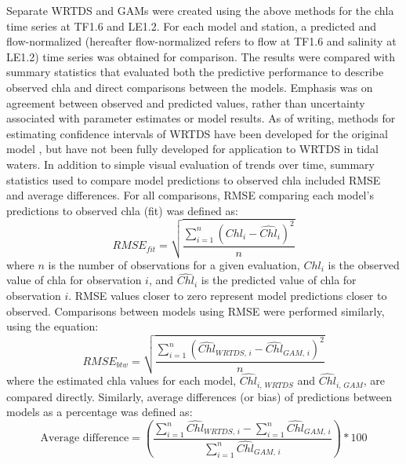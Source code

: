 \documentclass[letterpaper,12pt,oneside]{article}\usepackage[]{graphicx}\usepackage[]{color}
\begin{document}
Separate \ac{WRTDS} and \acp{GAM} were created using the above methods for the \ac{chla} time series at TF1.6 and LE1.2. For each model and station, a predicted and flow-normalized (hereafter flow-normalized refers to flow at TF1.6 and salinity at LE1.2) time series was obtained for comparison.  The results were compared with summary statistics that evaluated both the predictive performance to describe observed \ac{chla} and direct comparisons between the models.  Emphasis was on agreement between observed and predicted values, rather than uncertainty associated with parameter estimates or model results.  As of writing, methods for estimating confidence intervals of \ac{WRTDS} have been developed for the original model \citep{Hirsch15}, but have not been fully developed for application to \ac{WRTDS} in tidal waters.  In addition to simple visual evaluation of trends over time, summary statistics used to compare model predictions to observed \ac{chla} included \ac{RMSE} and average differences.  For all comparisons, \ac{RMSE} comparing each model's predictions to observed \ac{chla} (fit) was defined as:
\begin{equation}
RMSE_{fit} = \sqrt {\frac{{\sum\limits_{{i = 1}}^n {{{\left( {{Chl_i} - {\widehat{Chl}_i}} \right)}^2}} }}{n}}
\end{equation}
where $n$ is the number of observations for a given evaluation, $Chl_i$ is the observed value of \ac{chla} for observation $i$, and ${\widehat{Chl}}_i$ is the predicted value of \ac{chla} for observation $i$.  \ac{RMSE} values closer to zero represent model predictions closer to observed.  Comparisons between models using \ac{RMSE} were performed similarly, using the equation:
\begin{equation} \label{rmse_fun}
RMSE_{btw} = \sqrt {\frac{{\sum\limits_{{i = 1}}^n {{{\left( {{\widehat{Chl}_{WRTDS,\,i}} - {{\widehat{Chl}}_{GAM,\,i}}} \right)}^2}} }}{n}}
\end{equation}
where the estimated \ac{chla} values for each model, $\widehat{Chl}_{i,\,WRTDS}$ and $\widehat{Chl}_{i,\,GAM}$, are compared directly.  Similarly, average differences (or bias) of predictions between models as a percentage was defined as:
\begin{equation} \label{avediff_fun}
\textrm{Average difference} = \left(\frac{\sum\limits_{i = 1}^n \widehat{Chl}_{WRTDS,\,i} - \sum\limits_{i = 1}^n \widehat{Chl}_{GAM,\,i}}{\sum\limits_{i = 1}^n \widehat{Chl}_{GAM,\,i}}\right) * 100
\end{equation}
\end{document}
